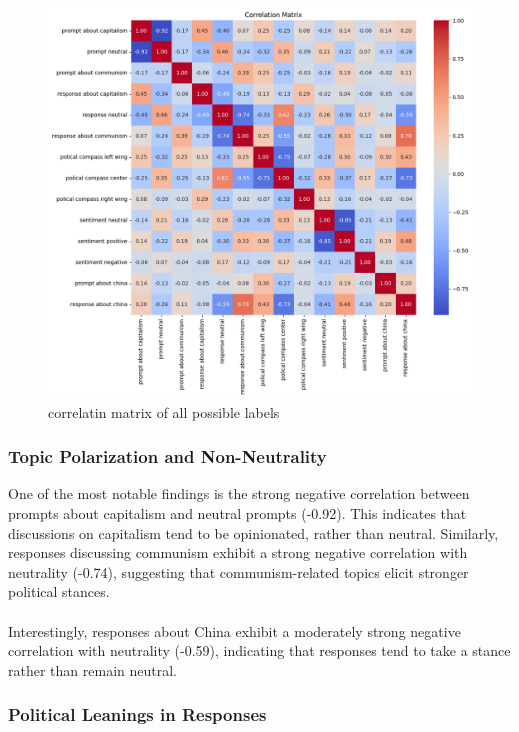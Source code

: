 \documentclass[pdflatex,sn-mathphys-num]{sn-jnl}%
\theoremstyle{thmstyleone}%
\theoremstyle{thmstyletwo}%
\theoremstyle{thmstylethree}%
\begin{document}
\begin{figure}[H]
    \centering
    \includegraphics[width=\textwidth]{plots/corr_matrix.png} %
    \caption{correlatin matrix of all possible labels}
    \label{fig:3}
\end{figure}

\subsubsection{Topic Polarization and Non-Neutrality}

One of the most notable findings is the strong negative correlation between prompts about capitalism and neutral prompts (-0.92). This indicates that discussions on capitalism tend to be opinionated, rather than neutral. Similarly, responses discussing communism exhibit a strong negative correlation with neutrality (-0.74), suggesting that communism-related topics elicit stronger political stances.
\\\\
Interestingly, responses about China exhibit a moderately strong negative correlation with neutrality (-0.59), indicating that responses tend to take a stance rather than remain neutral.

\subsubsection{Political Leanings in Responses}
\end{document}
